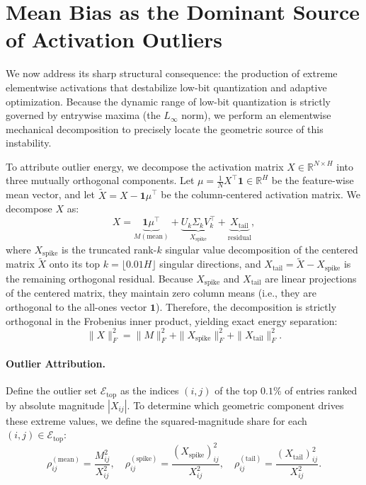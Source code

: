 \section{Mean Bias as the Dominant Source of Activation Outliers}
\label{sec:activation_outliers}

We now address its sharp structural consequence: the production of extreme elementwise activations that destabilize low-bit quantization and adaptive optimization. Because the dynamic range of low-bit quantization is strictly governed by entrywise maxima (the $L_\infty$ norm), we perform an elementwise mechanical decomposition to precisely locate the geometric source of this instability.

To attribute outlier energy, we decompose the activation matrix $X \in \mathbb{R}^{N \times H}$ into three mutually orthogonal components. Let $\mu = \frac{1}{N}X^\top \mathbf{1} \in \mathbb{R}^H$ be the feature-wise mean vector, and let $\tilde{X} = X - \mathbf{1}\mu^\top$ be the column-centered activation matrix. We decompose $X$ as:
\begin{equation}
X = \underbrace{\mathbf{1}\mu^\top}_{M (\text{mean})} + \underbrace{U_k \Sigma_k V_k^\top}_{X_{\text{spike}}} + \underbrace{X_{\text{tail}}}_{\text{residual}},
\end{equation}
where $X_{\text{spike}}$ is the truncated rank-$k$ singular value decomposition of the centered matrix $\tilde{X}$ onto its top $k = \lfloor 0.01 H \rfloor$ singular directions, and $X_{\text{tail}} = \tilde{X} - X_{\text{spike}}$ is the remaining orthogonal residual. Because $X_{\text{spike}}$ and $X_{\text{tail}}$ are linear projections of the centered matrix, they maintain zero column means (i.e., they are orthogonal to the all-ones vector $\mathbf{1}$). Therefore, the decomposition is strictly orthogonal in the Frobenius inner product, yielding exact energy separation:
\begin{equation}
\|X\|_F^2 = \|M\|_F^2 + \|X_{\text{spike}}\|_F^2 + \|X_{\text{tail}}\|_F^2.
\end{equation}

\paragraph{Outlier Attribution.} 
Define the outlier set $\mathcal{E}_{\text{top}}$ as the indices $(i,j)$ of the top $0.1\%$ of entries ranked by absolute magnitude $|X_{ij}|$. To determine which geometric component drives these extreme values, we define the squared-magnitude share for each $(i,j) \in \mathcal{E}_{\text{top}}$:
\begin{equation}
\rho_{ij}^{(\text{mean})} = \frac{M_{ij}^2}{X_{ij}^2}, \quad \rho_{ij}^{(\text{spike})} = \frac{(X_{\text{spike}})_{ij}^2}{X_{ij}^2}, \quad \rho_{ij}^{(\text{tail})} = \frac{(X_{\text{tail}})_{ij}^2}{X_{ij}^2}.
\end{equation}

